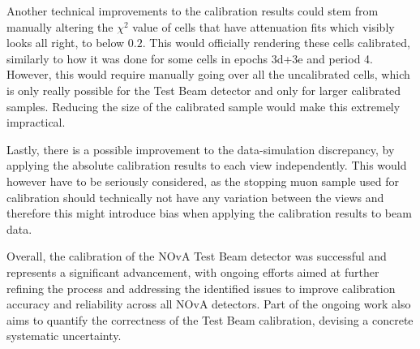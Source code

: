 Another technical improvements to the calibration results could stem from manually altering the $\chi^2$ value of cells that have attenuation fits which visibly looks all right, to below $0.2$. This would officially rendering these cells calibrated, similarly to how it was done for some cells in epochs 3d+3e and period 4. However, this would require manually going over all the uncalibrated cells, which is only really possible for the Test Beam detector and only for larger calibrated samples. Reducing the size of the calibrated sample would make this extremely impractical.


Lastly, there is a possible improvement to the data-simulation discrepancy, by applying the absolute calibration results to each view independently. This would however have to be seriously considered, as the stopping muon sample used for calibration should technically not have any variation between the views and therefore this might introduce bias when applying the calibration results to beam data.



Overall, the calibration of the NOvA Test Beam detector was successful and represents a significant advancement, with ongoing efforts aimed at further refining the process and addressing the identified issues to improve calibration accuracy and reliability across all \gls{NOvA} detectors. Part of the ongoing work also aims to quantify the correctness of the Test Beam calibration, devising a concrete systematic uncertainty.



